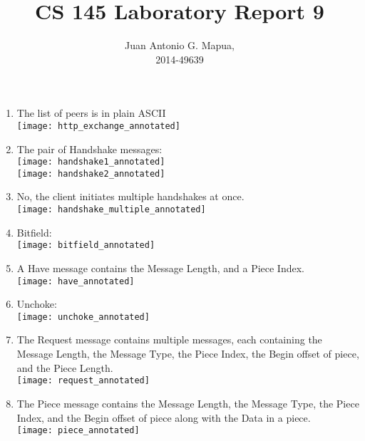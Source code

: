 \documentclass[fleqn]{article}
\begin{document}
 \title{CS 145 Laboratory Report 9}
\author{Juan Antonio G. Mapua,\\2014-49639}
\maketitle
\begin{enumerate}
\item The list of peers is in plain ASCII\\
\texttt{[image: http\_exchange\_annotated]}
\item The pair of Handshake messages:\\
\texttt{[image: handshake1\_annotated]}\\
\texttt{[image: handshake2\_annotated]}
\item No, the client initiates multiple handshakes at once.\\
\texttt{[image: handshake\_multiple\_annotated]}
\item Bitfield:\\
\texttt{[image: bitfield\_annotated]}
\item A Have message contains the Message Length, and a Piece Index.\\
\texttt{[image: have\_annotated]}
\item Unchoke:\\
\texttt{[image: unchoke\_annotated]}
\item The Request message contains multiple messages, each containing the Message Length, the Message Type, the Piece Index, the Begin offset of piece, and the Piece Length.\\
\texttt{[image: request\_annotated]}
\item The Piece message contains the Message Length, the Message Type, the Piece Index, and the Begin offset of piece along with the Data in a piece.\\
\texttt{[image: piece\_annotated]}
\end{enumerate}
\end{document}

